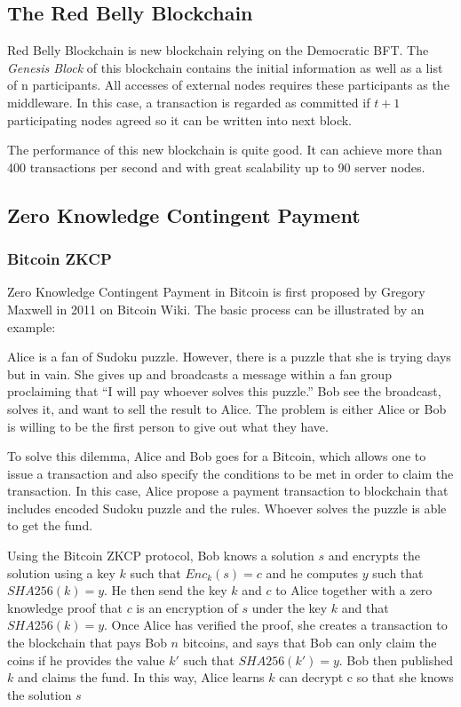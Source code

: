 \documentclass[12pt]{article}
\begin{document}
\subsection{The Red Belly Blockchain}

Red Belly Blockchain is new blockchain relying on the Democratic BFT. The \textit{Genesis Block} of this blockchain contains the initial information as well as a list of n participants. All accesses of external nodes requires these participants as the middleware. In this case, a transaction is regarded as committed if $t+1$ participating nodes agreed so it can be written into next block.

The performance of this new blockchain is quite good. It can achieve more than 400 transactions per second and with great scalability up to 90 server nodes.

\subsection{Zero Knowledge Contingent Payment}
\label{sec:Zero Knowledge Contingent Payment}

\subsubsection{Bitcoin ZKCP}

Zero Knowledge Contingent Payment in Bitcoin is first proposed by Gregory Maxwell in 2011 on Bitcoin Wiki\cite{maxwell5zero}. The basic process can be illustrated by an example\cite{campanelli2017zero}:

\begin{displayquote}
    Alice is a fan of Sudoku puzzle. However, there is a puzzle that she is trying days but in vain. She gives up and broadcasts a message within a fan group proclaiming that ``I will pay whoever solves this puzzle.'' Bob see the broadcast, solves it, and want to sell the result to Alice. The problem is either Alice or Bob is willing to be the first person to give out what they have.

    To solve this dilemma, Alice and Bob goes for a Bitcoin, which allows one to issue a transaction and also specify the conditions to be met in order to claim the transaction. In this case, Alice propose a payment transaction to blockchain that includes encoded Sudoku puzzle and the rules. Whoever solves the puzzle is able to get the fund.

    Using the Bitcoin ZKCP protocol, Bob knows a solution $s$ and encrypts the solution using a key $k$ such that $Enc_k(s)=c$ and he computes $y$ such that $SHA256(k)=y$. He then send the key $k$ and $c$ to Alice together with a zero knowledge proof that $c$ is an encryption of $s$ under the key $k$ and  that $SHA256(k)=y$. Once Alice has verified the proof, she creates a transaction to the blockchain that pays Bob $n$ bitcoins, and says that Bob can only claim the coins if he provides the value $k'$ such that $SHA256(k')=y$. Bob then published $k$ and claims the fund. In this way, Alice learns $k$ can decrypt c so that she knows the solution $s$
\end{displayquote}
\end{document}

